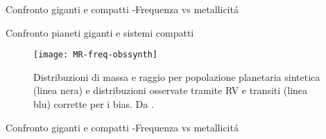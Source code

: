 \begin{wordonframe}{Confronto giganti e compatti -Frequenza vs metallicit\'a}

\end{wordonframe}

\begin{frame}{Confronto pianeti giganti e sistemi compatti}
\begin{figure}[!ht]\texttt{[image: MR-freq-obssynth]}\caption{Distribuzioni di massa e raggio per popolazione planetaria sintetica (linea nera) e distribuzioni osservate tramite RV e transiti (linea blu) corrette per i bias. Da \cite{mordasini2018planetary}.}\label{fig:MR-freq-obssynth}\end{figure}
\end{frame}

\begin{wordonframe}{Confronto giganti e compatti -Frequenza vs metallicit\'a}

\end{wordonframe}
